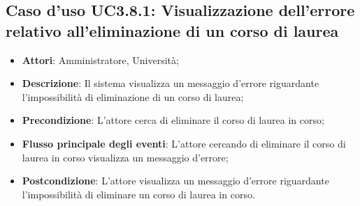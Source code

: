 \subsection{Caso d'uso \texorpdfstring{UC3.8.1}{UC3.8.1}: Visualizzazione dell'errore relativo all'eliminazione di un corso di laurea}
\begin{itemize}
\item \textbf{Attori}: Amministratore, Università;
\item \textbf{Descrizione}: Il sistema visualizza un messaggio d'errore riguardante l'impossibilità di eliminazione di un corso di laurea;

\item \textbf{Precondizione}: L'attore cerca di eliminare il corso di laurea in corso;

\item \textbf{Flusso principale degli eventi}: L'attore cercando di eliminare il corso di laurea in corso visualizza un messaggio d'errore;

\item \textbf{Postcondizione}: L'attore visualizza un messaggio d'errore riguardante l'impossibilità di eliminare un corso di laurea in corso.

\end{itemize}
